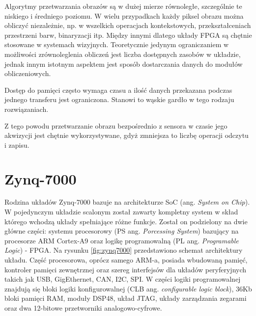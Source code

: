 Algorytmy przetwarzania obrazów są w dużej mierze równoległe, szczególnie te niskiego i średniego poziomu. W wielu przypadkach każdy piksel obrazu można obliczyć niezależnie, np. w wszelkich operacjach kontekstowych, przekształceniach przestrzeni barw, binaryzacji itp. Między innymi dlatego układy FPGA są chętnie stosowane w systemach wizyjnych. Teoretycznie jedynym ograniczaniem w możliwości zrównoleglenia obliczeń jest liczba dostępnych zasobów w układzie, jednak innym istotnym aspektem jest sposób dostarczania danych do modułów obliczeniowych. 

Dostęp do pamięci często wymaga czasu a ilość danych przekazana podczas jednego transferu jest ograniczona. Stanowi to wąskie gardło w tego rodzaju rozwiązaniach.

Z tego powodu przetwarzanie obrazu bezpośrednio z sensora w czasie jego akwizycji jest chętnie wykorzystywane, gdyż zmniejsza to liczbę operacji odczytu i zapisu. \cite{garcia2014survey}




\section{Zynq-7000}

Rodzina układów Zynq-7000 bazuje na architekturze SoC (ang. \textit{System on Chip}). W pojedynczym układzie scalonym został zawarty kompletny system w skład którego wchodzą układy spełniające różne funkcje. Został on podzielony na dwie główne części: systemu procesorowy (PS ang. \textit{Porcessing System}) bazujący na procesorze ARM Cortex-A9 oraz logikę programowalną (PL ang. \textit{Programable Logic}) - FPGA. %
Na rysunku \ref{fig:zynq7000} przedstawiono schemat architektury układu. %
Część procesorowa, oprócz samego ARM-a, posiada wbudowaną pamięć, kontroler pamięci zewnętrznej oraz szereg interfejsów dla układów peryferyjnych takich jak USB, GigEthernet, CAN, I2C, SPI. %
W części logiki programowalnej znajdują się bloki logiki konfigurowalnej (CLB ang. \textit{configurable logic block}), 36Kb bloki pamięci RAM, moduły DSP48, układ JTAG, układy zarządzania zegarami oraz dwa 12-bitowe przetworniki analogowo-cyfrowe.

